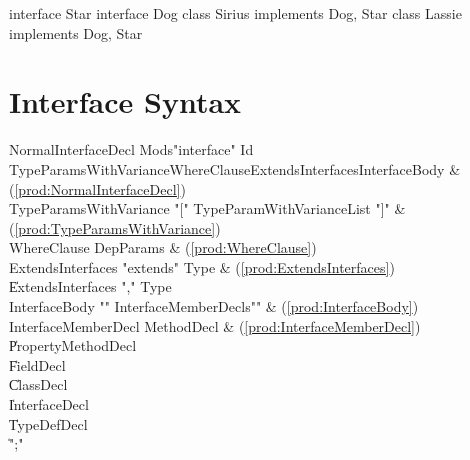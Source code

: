 \begin{ex}
\begin{xten}
interface Star{}
interface Dog{}
class Sirius implements Dog, Star{}
class Lassie implements Dog, Star{}
\end{xten}
%
\end{ex}


\section{Interface Syntax}

\label{DepType:Interface}

\begin{bbgrammar}
 NormalInterfaceDecl \: Mods\opt \xcd"interface" Id TypeParamsWithVariance\opt  WhereClause\opt ExtendsInterfaces\opt InterfaceBody & (\ref{prod:NormalInterfaceDecl}) \\
TypeParamsWithVariance \: \xcd"[" TypeParamWithVarianceList \xcd"]" & (\ref{prod:TypeParamsWithVariance}) \\
         WhereClause \: DepParams & (\ref{prod:WhereClause}) \\
   ExtendsInterfaces \: \xcd"extends" Type & (\ref{prod:ExtendsInterfaces}) \\
                    \| ExtendsInterfaces \xcd"," Type \\
       InterfaceBody \: \xcd"{" InterfaceMemberDecls\opt \xcd"}" & (\ref{prod:InterfaceBody}) \\
 InterfaceMemberDecl \: MethodDecl & (\ref{prod:InterfaceMemberDecl}) \\
                    \| PropertyMethodDecl \\
                    \| FieldDecl \\
                    \| ClassDecl \\
                    \| InterfaceDecl \\
                    \| TypeDefDecl \\
                    \| \xcd";" \\
\end{bbgrammar}


